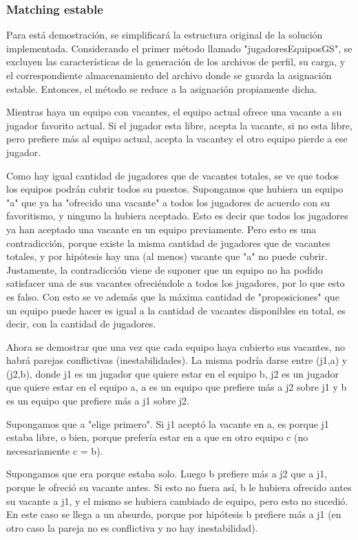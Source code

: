 \documentclass[article,a4paper]{article}
\begin{document}
\subsubsection{Matching estable}

Para está demostración, se simplificará la estructura original de la solución implementada. Considerando el primer método llamado "jugadoresEquiposGS", se excluyen las características de la generación de los archivos de perfil, su carga, y el correspondiente almacenamiento del archivo donde se guarda la asignación estable. Entonces, el método se reduce a la asignación propiamente dicha.

Mientras haya un equipo con vacantes, el equipo actual ofrece una vacante a su jugador favorito actual. Si el jugador esta libre, acepta la vacante, si no esta libre, pero prefiere más al equipo actual, acepta la vacantey el otro equipo pierde a ese jugador.

Como hay igual cantidad de jugadores que de vacantes totales, se ve que todos los equipos podrán cubrir todos su puestos. Supongamos que hubiera un equipo "a" que ya ha "ofrecido una vacante" a todos los jugadores de acuerdo con su favoritismo, y ninguno la hubiera aceptado. Esto es decir que todos los jugadores ya han aceptado una vacante en un equipo previamente. Pero esto es una contradicción, porque existe la misma cantidad de jugadores que de vacantes totales, y por hipótesis hay una (al menos) vacante que "a" no puede cubrir. Justamente, la contradicción viene de suponer que un equipo no ha podido satisfacer una de sus vacantes ofreciéndole a todos los jugadores, por lo que esto es falso. Con esto se ve además que la máxima cantidad de "proposiciones" que un equipo puede hacer es igual a la cantidad de vacantes disponibles en total, es decir, con la cantidad de jugadores.

Ahora se demostrar que una vez que cada equipo haya cubierto sus vacantes, no habrá parejas conflictivas (inestabilidades). La misma podría darse entre (j1,a) y (j2,b), donde j1 es un jugador que quiere estar en el equipo b, j2 es un jugador que quiere estar en el equipo a, a es un equipo que prefiere más a j2 sobre j1 y b es un equipo que prefiere más a j1 sobre j2.

Supongamos que a "elige primero". Si j1 aceptó la vacante en a, es porque j1 estaba libre, o bien, porque prefería estar en a que en otro equipo c (no necesariamente c = b).     

Supongamos que era porque estaba solo. Luego b prefiere más a j2 que a j1, porque le ofreció su vacante antes. Si esto no fuera así, b le hubiera ofrecido antes su vacante a j1, y el mismo se hubiera cambiado de equipo, pero esto no sucedió. En este caso se llega a un absurdo, porque por hipótesis b prefiere más a j1 (en otro caso la pareja no es conflictiva y no hay inestabilidad).
\end{document}
